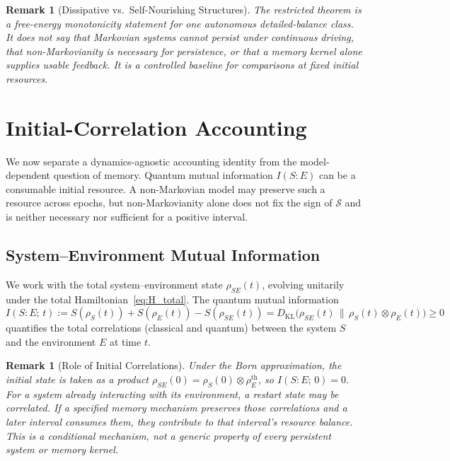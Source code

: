 \documentclass[12pt]{article}
\newtheorem{remark}[theorem]{Remark}
\begin{document}
\begin{remark}[Dissipative vs.\ Self-Nourishing Structures]
\label{rem:ceiling_physics}
The restricted theorem is a free-energy monotonicity statement for one
autonomous detailed-balance class.  It does not say that Markovian
systems cannot persist under continuous driving, that non-Markovianity
is necessary for persistence, or that a memory kernel alone supplies
usable feedback.  It is a controlled baseline for comparisons at fixed
initial resources.
\end{remark}

\section{Initial-Correlation Accounting}
\label{sec:advantage}

We now separate a dynamics-agnostic accounting identity from the
model-dependent question of memory.  Quantum mutual information
$I(S{:}E)$ can be a consumable initial resource.  A non-Markovian model
may preserve such a resource across epochs, but non-Markovianity alone
does not fix the sign of $\mathcal S$ and is neither necessary nor
sufficient for a positive interval.

\subsection{System--Environment Mutual Information}

We work with the total system--environment state
$\rho_{SE}(t)$, evolving unitarily under the total
Hamiltonian~\eqref{eq:H_total}.
The quantum mutual information
\begin{equation}
\label{eq:mutual_info}
I(S{:}E;\, t) := S(\rho_S(t)) + S(\rho_E(t))
  - S(\rho_{SE}(t))
= D_{\mathrm{KL}}\!\bigl(\rho_{SE}(t) \,\big\|\,
  \rho_S(t) \otimes \rho_E(t)\bigr)
\geq 0
\end{equation}
quantifies the total correlations (classical and quantum)
between the system $S$ and the environment $E$ at time $t$.

\begin{remark}[Role of Initial Correlations]
\label{rem:initial_corr}
Under the Born approximation, the initial state is taken as a
product $\rho_{SE}(0) = \rho_S(0) \otimes \rho_E^{\mathrm{th}}$,
so $I(S{:}E;\, 0) = 0$.
For a system already interacting with its environment, a restart state
\emph{may} be correlated.  If a specified memory mechanism preserves
those correlations and a later interval consumes them, they contribute
to that interval's resource balance.  This is a conditional mechanism,
not a generic property of every persistent system or memory kernel.
\end{remark}
\end{document}
